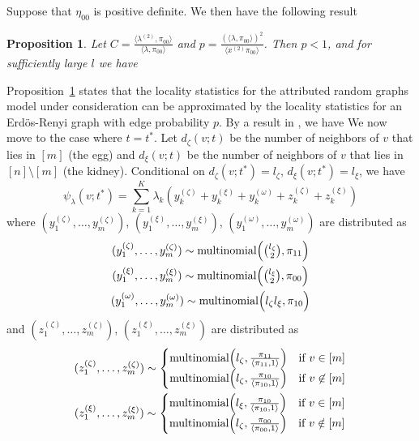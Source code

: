 \documentclass[draftcls]{IEEEtran}
\newtheorem{proposition}[theorem]{Proposition}
\theoremstyle{definition}
\begin{document}
Suppose that $\eta_{00}$ is positive definite. We then have the
following result
\begin{proposition}
  \label{prop:1}
  Let $C = \tfrac{\langle \lambda^{(2)}, \pi_{00} \rangle}{\langle
    \lambda, \pi_{00}\rangle}$ and $p = \tfrac{(\langle \lambda, \pi_{00}
    \rangle)^{2}}{\langle x^{(2)} \pi_{00} \rangle}$. Then $p < 1$,
  and for sufficiently large $l$ we have
\end{proposition}
Proposition~\ref{prop:1} states that the locality
statistics for the attributed random graphs model under consideration
can be approximated by the locality statistics for an
Erd\"{o}s-Renyi graph with edge probability $p$. By a result in
\cite{rukhin:_limit_distr_graph_scan_statis}, we have
We now move to the case where $t = t^{*}$. Let $d_{\zeta}(v;t)$ be
the number of neighbors of $v$ that lies in $[m]$ (the egg) and
$d_{\xi}(v;t)$ be the number of neighbors of $v$ that lies in $[n]
\setminus [m]$ (the kidney). Conditional on $d_{\zeta}(v;t^{*}) =
l_{\zeta}$, $d_{\xi}(v;t^{*}) = l_{\xi}$, we have
\begin{equation}
  \psi_{\lambda}(v;t^{*}) = \sum_{k=1}^{K} \lambda_k ( y^{(\zeta)}_k + y^{(\xi)}_k +
  y^{(\omega)}_k + z^{(\zeta)}_k + z^{(\xi)}_k)
\end{equation}
where $(y^{(\zeta)}_1, \dots, y^{(\zeta)}_m)$, $(y^{(\xi)}_1,\dots,
 y^{(\xi)}_m)$, $(y^{(\omega)}_1, \dots, y^{(\omega)}_m)$ are
 distributed as
\begin{gather*}
(y^{(\zeta)}_1,\dots,y^{(\zeta)}_m) \sim \textrm{multinomial}\Bigl(
\tbinom{l_\zeta}{2}, \pi_{11}\Bigr) \\ 
(y^{(\xi)}_1,\dots,y^{(\xi)}_m) \sim \textrm{multinomial}\Bigl(
\tbinom{l_\xi}{2}, \pi_{00}\Bigr) \\
(y^{(\omega)}_1,\dots,y^{(\omega)}_m) \sim \textrm{multinomial}\Bigl(
l_\zeta l_\xi, \pi_{10}\Bigr)
\end{gather*}
and $(z^{(\zeta)}_1, \dots, z^{(\zeta)}_m)$, $(z^{(\xi)}_1, \dots,
z^{(\xi)}_m)$ are distributed as
\begin{gather*}
(z^{(\zeta)}_1, \dots, z^{(\zeta)}_m) \sim
\begin{cases}
\textrm{multinomial}\Bigl(l_\zeta, \frac{\pi_{11}}{\langle \pi_{11},
  1\rangle}\Bigr) & \text{if $v \in [m]$} \\
\textrm{multinomial}\Bigl(l_\zeta, \frac{\pi_{10}}{\langle \pi_{10}, 1
  \rangle} \Bigr) & \text{if $v \not\in [m]$}
\end{cases} \\
(z^{(\xi)}_1, \dots, z^{(\xi)}_m) \sim
\begin{cases}
\textrm{multinomial}\Bigl(l_\xi, \frac{\pi_{10}}{\langle \pi_{10},
  1\rangle}\Bigr) & \text{if $v \in [m]$} \\
\textrm{multinomial}\Bigl(l_\zeta, \frac{\pi_{00}}{\langle \pi_{00}, 1
  \rangle} \Bigr) & \text{if $v \notin [m]$}
\end{cases} 
\end{gather*}
\end{document}
